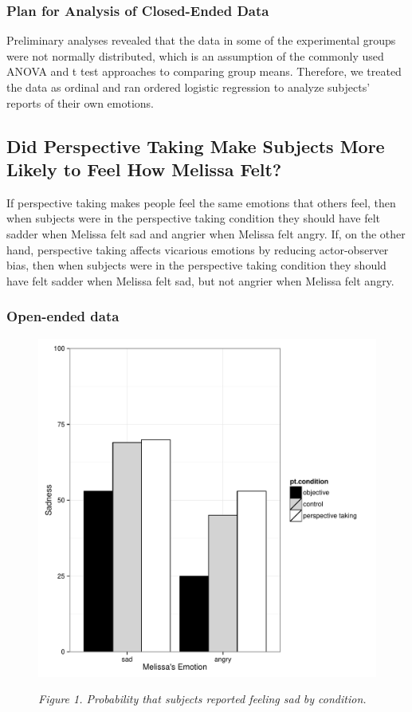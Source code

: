 \documentclass[man,a4paper,noextraspace,apacite]{apa6}\usepackage[]{graphicx}\usepackage[]{color}
\makeatletter
\def\maxwidth{ %
  \ifdim\Gin@nat@width>\linewidth
    \linewidth
  \else
    \Gin@nat@width
  \fi
}
\newenvironment{knitrout}{}{} %
\makeatother
\begin{document}
\subsubsection{Plan for Analysis of Closed-Ended Data} Preliminary analyses revealed that the data in some of the experimental groups were not normally distributed, which is an assumption of the commonly used ANOVA and t test approaches to comparing group means. Therefore, we treated the data as ordinal and ran ordered logistic regression to analyze subjects' reports of their own emotions.


\subsection{Did Perspective Taking Make Subjects More Likely to Feel How Melissa Felt?}

If perspective taking makes people feel the same emotions that others feel, then when subjects were in the perspective taking condition they should have felt sadder when Melissa felt sad and angrier when Melissa felt angry. If, on the other hand, perspective taking affects vicarious emotions by reducing actor-observer bias, then when subjects were in the perspective taking condition they should have felt sadder when Melissa felt sad, but not angrier when Melissa felt angry.

\subsubsection{Open-ended data}

\begin{figure}
\begin{knitrout}
\color{fgcolor}
\includegraphics[width=\maxwidth]{figure/Figure1Sad-1} 

\end{knitrout}
\textit{Figure 1. Probability that subjects reported feeling sad by condition.}
\end{figure}
\end{document}
